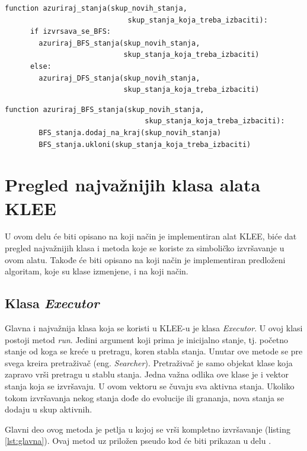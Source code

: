 \documentclass[12pt,oneside]{memoir}
\begin{document}
    \begin{lstlisting}[caption={Pseudokod funkcije za azuriranje stanja},captionpos=b,label={lst:azuriraj_stanja}]
    function azuriraj_stanja(skup_novih_stanja, 
                             skup_stanja_koja_treba_izbaciti):
      if izvrsava_se_BFS:
        azuriraj_BFS_stanja(skup_novih_stanja, 
                            skup_stanja_koja_treba_izbaciti)
      else:
        azuriraj_DFS_stanja(skup_novih_stanja, 
                            skup_stanja_koja_treba_izbaciti)
    \end{lstlisting}
    
    \begin{lstlisting}[caption={Pseudokod funkcije za ažuriranje BFS stanja},captionpos=b,label={lst:azuriraj_BFS}]
    function azuriraj_BFS_stanja(skup_novih_stanja, 
                                 skup_stanja_koja_treba_izbaciti):
        BFS_stanja.dodaj_na_kraj(skup_novih_stanja)
        BFS_stanja.ukloni(skup_stanja_koja_treba_izbaciti)
    \end{lstlisting}
    
\section{Pregled najvažnijih klasa alata KLEE}
U ovom delu će biti opisano na koji način je implementiran alat KLEE, biće dat pregled najvažnijih klasa i metoda koje se koriste za simboličko izvršavanje u ovom alatu. Takođe će biti opisano na koji način je implementiran predloženi algoritam, koje su klase izmenjene, i na koji način.

\subsection{Klasa \textit{Executor}}
Glavna i najvažnija klasa koja se koristi u KLEE-u je klasa \textit{Executor}. U ovoj klasi postoji metod \textit{run}. Jedini argument koji prima je inicijalno stanje, tj. početno stanje od koga se kreće u pretragu, koren stabla stanja. Unutar ove metode se pre svega kreira pretraživač (eng. \textit{Searcher}). 
Pretraživač je samo objekat klase koja zapravo vrši pretragu u stablu stanja. Jedna važna odlika ove klase je i vektor stanja koja se izvršavaju. U ovom vektoru se čuvaju sva aktivna stanja. Ukoliko tokom izvršavanja nekog stanja dođe do evolucije ili grananja, nova stanja se dodaju u skup aktivnih.

Glavni deo ovog metoda je petlja u kojoj se vrši kompletno izvršavanje (listing \ref{lst:glavna}). Ovaj metod uz priložen pseudo kod će biti prikazan u delu .
\end{document}
